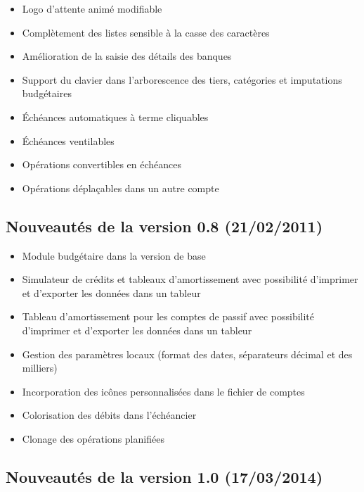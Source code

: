 \begin{itemize}
	\item Logo d'attente animé modifiable
	\item Complètement des listes sensible à la casse des caractères
	\item Amélioration de la saisie des détails des banques
	\item Support du clavier dans l'arborescence des tiers, catégories et imputations budgétaires
	\item Échéances automatiques à terme cliquables
	\item Échéances ventilables
	\item Opérations convertibles en échéances
	\item Opérations déplaçables dans un autre compte
\end{itemize}


\subsection{Nouveautés de la version 0.8 \textnormal{(21/02/2011)}}

\begin{itemize}
	\item Module budgétaire dans la version de base
	\item Simulateur de crédits et tableaux d'amortissement avec possibilité d'imprimer et d'exporter les données dans un tableur
	\item Tableau d'amortissement pour les comptes de passif avec possibilité d'imprimer et d'exporter les données dans un tableur
	\item Gestion des paramètres locaux (format des dates, séparateurs décimal et des milliers)
	\item Incorporation des icônes personnalisées dans le fichier de comptes
	\item Colorisation des débits dans l'échéancier
	\item Clonage des opérations planifiées
\end{itemize}


\subsection{Nouveautés de la version 1.0 \textnormal{(17/03/2014)}}


